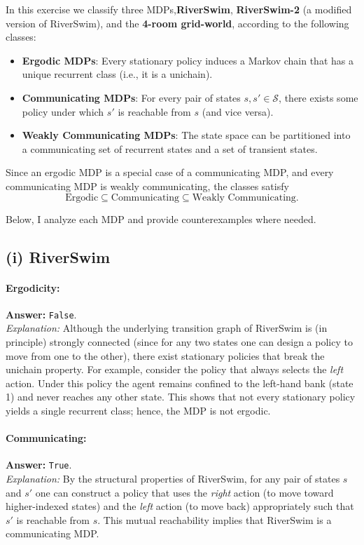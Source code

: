 In this exercise we classify three MDPs,\textbf{RiverSwim}, \textbf{RiverSwim-2} (a modified version of RiverSwim), and the \textbf{4-room grid-world}, according to the following classes:
\begin{itemize}
    \item \textbf{Ergodic MDPs}: Every stationary policy induces a Markov chain that has a unique recurrent class (i.e., it is a unichain).
    \item \textbf{Communicating MDPs}: For every pair of states $s, s' \in \mathcal{S}$, there exists some policy under which $s'$ is reachable from $s$ (and vice versa).
    \item \textbf{Weakly Communicating MDPs}: The state space can be partitioned into a communicating set of recurrent states and a set of transient states.
\end{itemize}
Since an ergodic MDP is a special case of a communicating MDP, and every communicating MDP is weakly communicating, the classes satisfy
\[
\text{Ergodic} \subseteq \text{Communicating} \subseteq \text{Weakly Communicating}.
\]

Below, I analyze each MDP and provide counterexamples where needed.

\subsection*{(i) RiverSwim}

\paragraph{Ergodicity:}  
\textbf{Answer:} \texttt{False}.\\[0.5em]
\textit{Explanation:}  
Although the underlying transition graph of RiverSwim is (in principle) strongly connected (since for any two states one can design a policy to move from one to the other), there exist stationary policies that break the unichain property. For example, consider the policy that always selects the \emph{left} action. Under this policy the agent remains confined to the left-hand bank (state 1) and never reaches any other state. This shows that not every stationary policy yields a single recurrent class; hence, the MDP is not ergodic.

\paragraph{Communicating:}  
\textbf{Answer:} \texttt{True}.\\[0.5em]
\textit{Explanation:}  
By the structural properties of RiverSwim, for any pair of states $s$ and $s'$ one can construct a policy that uses the \emph{right} action (to move toward higher-indexed states) and the \emph{left} action (to move back) appropriately such that $s'$ is reachable from $s$. This mutual reachability implies that RiverSwim is a communicating MDP.

